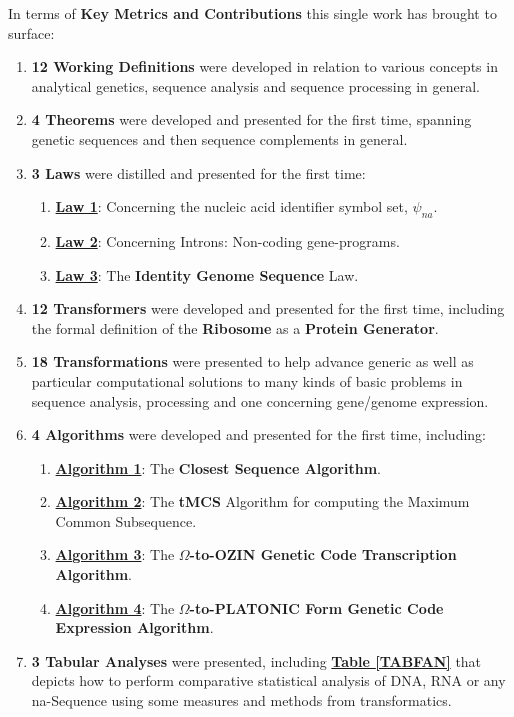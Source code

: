 \documentclass[a4paper, 18pt]{book} %
\begin{document}
In terms of \textbf{Key Metrics and Contributions} this single work has brought to surface:
\begin{enumerate}
\item \textbf{12 Working Definitions} were developed in relation to various concepts in analytical genetics, sequence analysis and sequence processing in general.
\item \textbf{4 Theorems} were developed and presented for the first time, spanning genetic sequences and then sequence complements in general.
\item {\textbf{3 Laws} were distilled and presented for the first time:
	\begin{enumerate}
	\item \textbf{\hyperref[LAWNA]{Law 1}}: Concerning the nucleic acid identifier symbol set, $\psi_{na}$. 
	\item \textbf{\hyperref[LAW2]{Law 2}}: Concerning Introns: Non-coding gene-programs.
	\item \textbf{\hyperref[LAWGDL]{Law 3}}: The \textbf{Identity Genome Sequence} Law.
	\end{enumerate}
}
\item \textbf{12 Transformers} were developed and presented for the first time, including the formal definition of the \textbf{Ribosome} as a \textbf{Protein Generator}.
\item \textbf{18 Transformations} were presented to help advance generic as well as particular computational solutions to many kinds of basic problems in sequence analysis, processing and one concerning gene/genome expression.
\item{\textbf{4 Algorithms} were developed and presented for the first time, including:
	\begin{enumerate}
	\item \textbf{\hyperref[ALGCSA]{Algorithm 1}}: The \textbf{Closest Sequence Algorithm}.
	\item \textbf{\hyperref[ALGtMCS]{Algorithm 2}}: The \textbf{tMCS} Algorithm for computing the Maximum Common Subsequence.
	\item \textbf{\hyperref[ALGCOZIN]{Algorithm 3}}: The \textbf{$\Omega$-to-OZIN Genetic Code Transcription Algorithm}.
	\item \textbf{\hyperref[ALGCOZINPLATO]{Algorithm 4}}: The \textbf{$\Omega$-to-PLATONIC Form Genetic Code Expression Algorithm}.
	\end{enumerate}
}
\item \textbf{3 Tabular Analyses} were presented, including \textbf{\hyperref[TABFAN]{Table \ref{TABFAN}}} that depicts how to perform comparative statistical analysis of DNA, RNA or any na-Sequence using some measures and methods from transformatics.

\end{enumerate}
\end{document}
